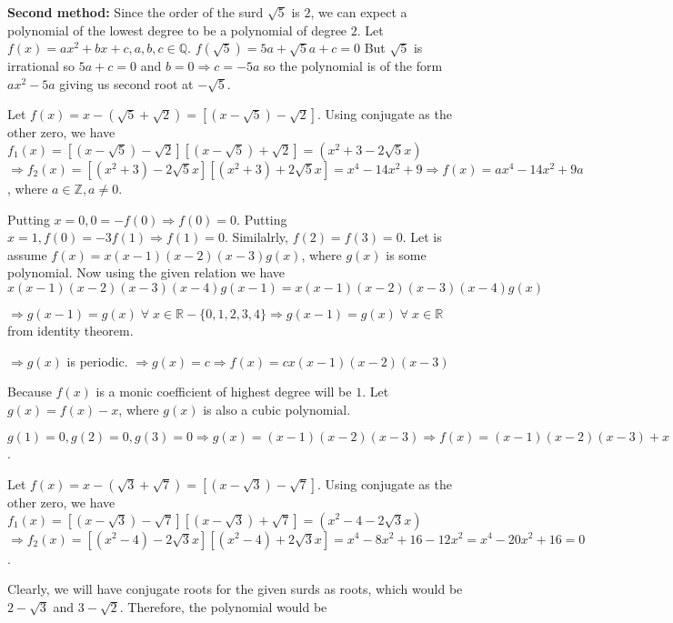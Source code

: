   {\bf Second method:} Since the order of the surd $\sqrt{5}$ is $2$, we can expect a polynomial of the
  lowest degree to be a polynomial of degree $2$. Let $f(x) = ax^2 + bx + c, a, b,
  c\in\mathbb{Q}$. $f(\sqrt{5}) = 5a + \sqrt{5}a + c = 0$ But $\sqrt{5}$ is irrational so $5a + c = 0$ and
  $b = 0\Rightarrow c = -5a$ so the polynomial is of the form $ax^2 - 5a$ giving us second root at
  $-\sqrt{5}$.
\item Let $f(x) = x - (\sqrt{5} + \sqrt{2}) = [(x - \sqrt{5}) - \sqrt{2}]$. Using conjugate as the other
  zero, we have $f_1(x) = [(x - \sqrt{5}) - \sqrt{2}][(x - \sqrt{5}) + \sqrt{2}] = (x^2 + 3 - 2\sqrt{5}x)$
  $\Rightarrow f_2(x) = [(x^2 + 3) - 2\sqrt{5}x][(x^2 + 3) + 2\sqrt{5}x] = x^4 - 14x^2 + 9\Rightarrow f(x) =
  ax^4 - 14x^2 + 9a$, where $a\in\mathbb{Z}, a\neq 0$.
\item Putting $x = 0, 0 = -f(0)\Rightarrow f(0) = 0$. Putting $x = 1, f(0) = -3f(1) \Rightarrow f(1) =
  0$. Similalrly, $f(2) = f(3) = 0$. Let is assume $f(x) = x(x - 1)(x - 2)(x - 3)g(x)$, where $g(x)$ is some
  polynomial. Now using the given relation we have $x(x - 1)(x - 2)(x - 3)(x - 4)g(x - 1) = x(x - 1)(x -
  2)(x - 3)(x - 4)g(x)$

  $\Rightarrow g(x - 1) = g(x)\;\forall\;x\in\mathbb{R} - \{0, 1, 2, 3, 4\} \Rightarrow g(x - 1) =
  g(x)\;\forall\;x\in\mathbb{R}$ from identity theorem.

  $\Rightarrow g(x)$ is periodic. $\Rightarrow g(x) = c \Rightarrow f(x) = cx(x - 1)(x - 2)(x - 3)$
\item Because $f(x)$ is a monic coefficient of highest degree will be $1$. Let $g(x) = f(x) - x$, where
  $g(x)$ is also a cubic polynomial.

  $g(1) = 0, g(2) = 0, g(3) = 0 \Rightarrow g(x) = (x - 1)(x - 2)(x - 3) \Rightarrow f(x) = (x - 1)(x - 2)(x
  - 3) + x \Rightarrow f(4) = 10$.
\item Let $f(x) = x - (\sqrt{3} + \sqrt{7}) = [(x - \sqrt{3}) - \sqrt{7}]$. Using conjugate as the other
  zero, we have $f_1(x) = [(x - \sqrt{3}) - \sqrt{7}][(x - \sqrt{3}) + \sqrt{7}] = (x^2 - 4 - 2\sqrt{3}x)$
  $\Rightarrow f_2(x) = [(x^2 - 4) - 2\sqrt{3}x][(x^2 - 4) + 2\sqrt{3}x] = x^4 - 8x^2 + 16 - 12x^2 = x^4 -
  20x^2 + 16 = 0$.
\item Clearly, we will have conjugate roots for the given surds as roots, which would be $2 - \sqrt{3}$ and
  $3 - \sqrt{2}$. Therefore, the polynomial would be

